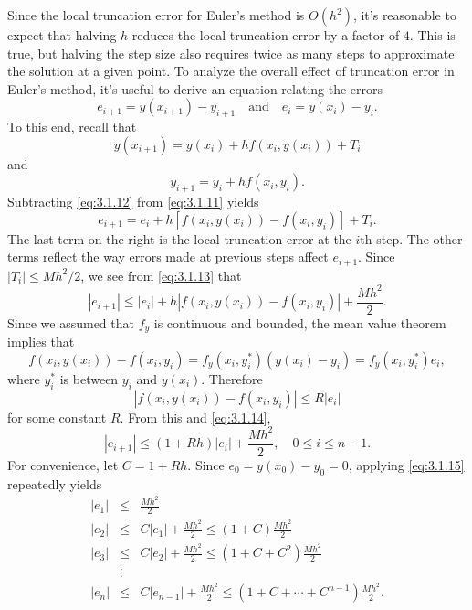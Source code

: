 \documentclass{ximera}
\begin{document}
Since the local truncation error for Euler's method is $O(h^2)$, it's
reasonable to expect that halving $h$ reduces the local truncation
error by a factor of $4$. This is true, but
 halving the step size also requires twice as many steps to
approximate the solution at a given point. To analyze the overall
effect of truncation error in Euler's method, it's useful to  derive
an equation relating the errors
$$
e_{i+1}=y(x_{i+1})-y_{i+1}\quad\mbox{and}\quad e_i=y(x_i)-y_i.
$$
To this end, recall that
\begin{equation} \label{eq:3.1.11}
y(x_{i+1})=y(x_i)+hf(x_i,y(x_i))+T_i
\end{equation}
and
\begin{equation} \label{eq:3.1.12}
y_{i+1}=y_i+hf(x_i,y_i).
\end{equation}
Subtracting \eqref{eq:3.1.12} from \eqref{eq:3.1.11} yields
\begin{equation} \label{eq:3.1.13}
e_{i+1}=e_i+h\left[f(x_i,y(x_i))-f(x_i,y_i)\right]+T_i.
\end{equation}
The last term on the right is the local truncation error at the $i$th
step. The other terms reflect the way errors made at {previous
steps} affect $e_{i+1}$. Since $|T_i|\leq Mh^2/2$, we see from
\eqref{eq:3.1.13} that
\begin{equation} \label{eq:3.1.14}
|e_{i+1}|\leq |e_i|+h|f(x_i,y(x_i))-f(x_i,y_i)|+\frac{Mh^2}{2}.
\end{equation}
Since we assumed that $f_y$ is continuous and bounded, the mean
value theorem implies that
$$
f(x_i,y(x_i))-f(x_i,y_i)=f_y(x_i,y_i^*)(y(x_i)-y_i)=f_y(x_i,y_i^*)e_i,
$$
where $y_i^*$ is between $y_i$ and $y(x_i)$. Therefore
$$
|f(x_i,y(x_i))-f(x_i,y_i)|\le R|e_i|
$$
for some constant $R$. From this and \eqref{eq:3.1.14},
\begin{equation} \label{eq:3.1.15}
|e_{i+1}|\leq (1+Rh)|e_i|+\frac{Mh^2}{2},\quad 0\leq i\leq n-1.
\end{equation}
For convenience, let $C=1+Rh$. Since $e_0=y(x_0)-y_0=0$, applying
\eqref{eq:3.1.15} repeatedly yields
\begin{eqnarray}
|e_1| & \leq & \frac{Mh^2}{2}\nonumber\\
|e_2| & \leq & C|e_1|+\frac{Mh^2}{2}\leq (1+C)\frac{Mh^2}{2}\nonumber\\
|e_3| & \leq & C|e_2|+\frac{Mh^2}{2}\leq (1+C+C^2)\frac{Mh^2}{2}\nonumber\\
 & \vdots &\nonumber \\|e_n| & \leq &
C|e_{n-1}|+\frac{Mh^2}{2}\leq (1+C+\cdots+C^{n-1})\frac{Mh^2}{2}.\label{eq:3.1.16}
\end{eqnarray}
\end{document}
